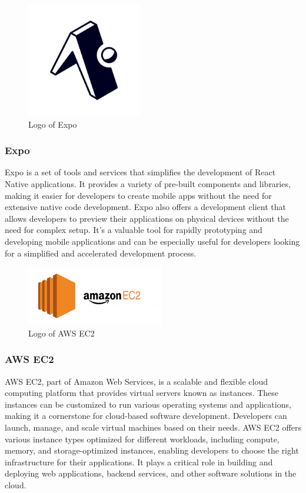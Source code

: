 \documentclass[conference]{IEEEtran}
\begin{document}
        \begin{figure}[htbp]
        \centerline{\includegraphics[width=5cm]{Images/logo/expo.png}}
        \label{fig}
        \caption{Logo of Expo}
        \end{figure}
        \subsubsection{Expo}
        Expo is a set of tools and services that simplifies the development of React Native applications. It provides a variety of pre-built components and libraries, making it easier for developers to create mobile apps without the need for extensive native code development. Expo also offers a development client that allows developers to preview their applications on physical devices without the need for complex setup. It's a valuable tool for rapidly prototyping and developing mobile applications and can be especially useful for developers looking for a simplified and accelerated development process.\\

        \begin{figure}[htbp]
        \centerline{\includegraphics[width=6cm]{Images/logo/aws.png}}
        \label{fig}
        \caption{Logo of AWS EC2}
        \end{figure}
        \subsubsection{AWS EC2}
        AWS EC2, part of Amazon Web Services, is a scalable and flexible cloud computing platform that provides virtual servers known as instances. These instances can be customized to run various operating systems and applications, making it a cornerstone for cloud-based software development. Developers can launch, manage, and scale virtual machines based on their needs. AWS EC2 offers various instance types optimized for different workloads, including compute, memory, and storage-optimized instances, enabling developers to choose the right infrastructure for their applications. It plays a critical role in building and deploying web applications, backend services, and other software solutions in the cloud.\\
    
\end{document}
